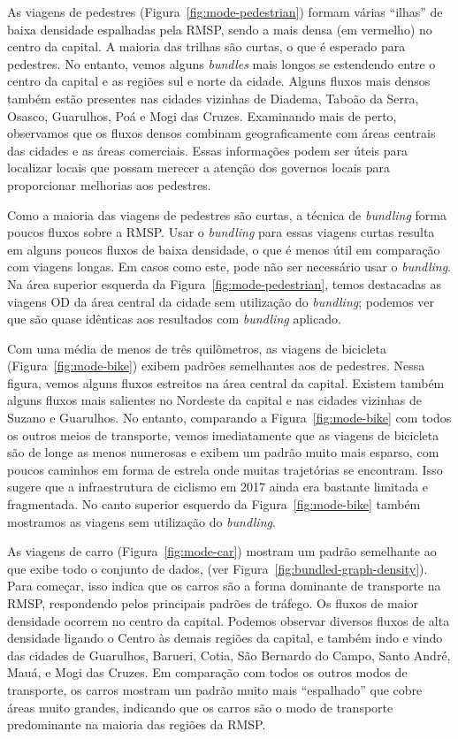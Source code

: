 As viagens de pedestres (Figura~\ref{fig:mode-pedestrian}) formam várias
``ilhas'' de baixa densidade espalhadas pela RMSP, sendo a mais densa (em vermelho)
no centro da capital. A maioria das trilhas são curtas, o que
é esperado para pedestres. No entanto, vemos alguns \emph{bundles} mais longos se estendendo
entre o centro da capital e as regiões sul e norte da cidade. Alguns fluxos mais densos também
estão presentes nas cidades vizinhas de Diadema, Taboão da Serra, Osasco,
Guarulhos, Poá e Mogi das Cruzes. Examinando mais de perto, observamos que
os fluxos densos combinam geograficamente com áreas centrais das cidades e as áreas comerciais. Essas
informações podem ser úteis para localizar locais que possam merecer a atenção
dos governos locais para proporcionar melhorias aos pedestres.

Como a maioria das viagens de pedestres são curtas, a técnica de \emph{bundling}
forma poucos fluxos sobre a RMSP. Usar o \emph{bundling} para essas viagens
curtas resulta em alguns poucos fluxos de baixa densidade, o que é menos útil em
comparação com viagens longas. Em casos como este, pode não ser necessário usar
o \emph{bundling}. Na área superior esquerda da
Figura~\ref{fig:mode-pedestrian}, temos destacadas as viagens OD da área central da
cidade sem utilização do \emph{bundling}; podemos ver que são quase idênticas
aos resultados com \emph{bundling} aplicado.

Com uma média de menos de três quilômetros, as viagens de bicicleta
(Figura~\ref{fig:mode-bike}) exibem padrões semelhantes aos de pedestres.  Nessa
figura, vemos alguns fluxos estreitos na área central da capital. Existem também
alguns fluxos mais salientes no Nordeste da capital e nas cidades vizinhas de
Suzano e Guarulhos. No entanto, comparando a Figura~\ref{fig:mode-bike} com
todos os outros meios de transporte, vemos imediatamente que as viagens de
bicicleta são de longe as menos numerosas e exibem um padrão muito mais esparso,
com poucos caminhos em forma de estrela onde muitas trajetórias se encontram.
Isso sugere que a infraestrutura de ciclismo em 2017 ainda era bastante limitada e fragmentada.
No canto superior esquerdo da Figura~\ref{fig:mode-bike} também mostramos
as viagens sem utilização do \emph{bundling}.

As viagens de carro (Figura~\ref{fig:mode-car}) mostram um padrão
semelhante ao que exibe todo o conjunto de dados, (ver Figura~\ref{fig:bundled-graph-density}).
Para começar, isso indica que os carros são a forma
dominante de transporte na RMSP, respondendo pelos principais padrões de
tráfego. Os fluxos de maior densidade ocorrem no centro da capital. Podemos observar diversos
fluxos de alta densidade ligando o Centro às demais regiões da capital, e também
indo e vindo das cidades de Guarulhos, Barueri, Cotia, São Bernardo do Campo,
Santo André, Mauá, e Mogi das Cruzes. Em comparação com todos os outros
modos de transporte, os carros mostram um padrão muito mais ``espalhado'' que
cobre áreas muito grandes, indicando que os carros são o modo de transporte
predominante na maioria das regiões da RMSP.

